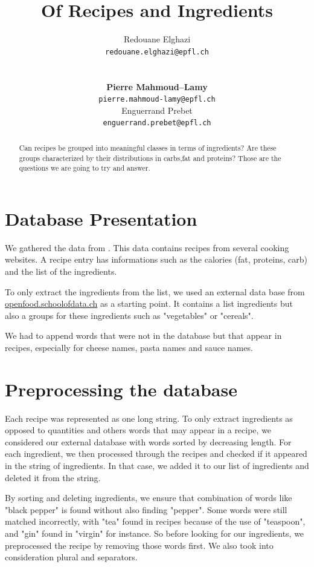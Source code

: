 \documentclass[11pt]{article}
\title{Of Recipes and Ingredients}
\author{Redouane Elghazi \\
  {\tt redouane.elghazi@epfl.ch} \\\And
  \\\\\textbf{Pierre Mahmoud--Lamy} \\
  {\tt pierre.mahmoud-lamy@epfl.ch} \\\And
Enguerrand Prebet \\
{\tt enguerrand.prebet@epfl.ch} \\}
\date{}
\begin{document}
\maketitle
\begin{abstract}
	
	Can recipes be grouped into meaningful classes in terms of ingredients? Are these groups characterized by their distributions in carbs,fat and proteins? Those are the questions we are going to try and answer.
\end{abstract}

\section{Database Presentation}
We gathered the data from . This data contains recipes from several cooking websites. A recipe entry has informations such as the calories (fat, proteins, carb) and the list of the ingredients. 

To only extract the ingredients from the list, we used an external data base from \href{http://openfood.schoolofdata.ch}{openfood.schoolofdata.ch} as a starting point. It contains a list ingredients but also a groups for these ingredients such as "vegetables" or "cereals".

We had to append words that were not in the database but that appear in recipes, especially for cheese names, pasta names and sauce names.

\section{Preprocessing the database}
Each recipe was represented as one long string. To only extract ingredients as opposed to quantities and others words that may appear in a recipe, we considered our external database with words sorted by decreasing length. For each ingredient, we then processed through the recipes and checked if it appeared in the string of ingredients. In that case, we added it to our list of ingredients and deleted it from the string.

By sorting and deleting ingredients, we ensure that combination of words like "black pepper" is found without also finding "pepper". Some words were still matched incorrectly, with "tea" found in recipes because of the use of "teaspoon", and "gin" found in "virgin" for instance. So before looking for our ingredients, we preprocessed the recipe by removing those words first.
We also took into consideration plural and separators.
\end{document}
